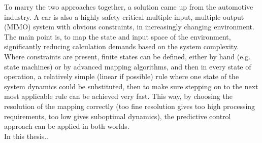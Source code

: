 To marry the two approaches together, a solution came up from the automotive industry. A car is also a highly safety critical multiple-input, multiple-output (MIMO) system with obvious constraints, in increasingly changing environment. The main point is, to map the state and input space of the environment, significantly reducing calculation demands based on the system complexity. Where constraints are present, finite states can be defined, either by hand (e.g. state machines) or by advanced mapping algorithms, and then in every state of operation, a relatively simple (linear if possible)  rule where one state of the system dynamics could be substituted, then to make sure stepping on to the next most applicable rule can be achieved very fast. This way, by choosing the resolution of the mapping correctly (too fine resolution gives too high processing requirements, too low gives suboptimal dynamics), the predictive control approach can be applied in both worlds.\\
In this thesis..


